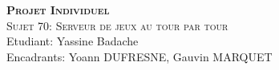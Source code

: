 \makeatletter
\begin{titlepage}
\centering
{\LARGE \textbf{\textsc{Projet Individuel}}}\\
\vspace{20em}
{\LARGE \textsc{Sujet 70: Serveur de jeux au tour par tour
}}\\


\vspace{6em}
{\LARGE Etudiant: Yassine Badache\\
	\vspace{2em}
		Encadrants: Yoann DUFRESNE, Gauvin MARQUET}\\


\vspace{15em}

\end{titlepage}
\makeatother

\sloppy